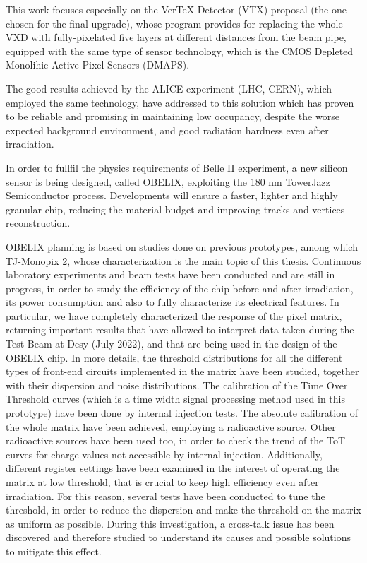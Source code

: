 This work focuses especially on the VerTeX Detector (VTX) proposal (the one chosen for the final upgrade), whose program provides for replacing the whole VXD with fully-pixelated five layers at different distances from the beam pipe, equipped with the same type of sensor technology, which is the CMOS Depleted Monolihic Active Pixel Sensors (DMAPS). 

The good results achieved by the ALICE experiment (LHC, CERN), which employed the same technology, have addressed to this solution which has proven to be reliable and promising in maintaining low occupancy, despite the worse expected background environment, and good radiation hardness even after irradiation. 

In order to fullfil the physics requirements of Belle II experiment, a new silicon sensor is being designed, called OBELIX, exploiting the 180 nm TowerJazz Semiconductor process. Developments will ensure a faster, lighter and highly granular chip, reducing the material budget and improving tracks and vertices reconstruction. 

OBELIX planning is based on studies done on previous prototypes, among which TJ-Monopix 2, whose characterization is the main topic of this thesis. Continuous laboratory experiments and beam tests have been conducted and are still in progress, in order to study the efficiency of the chip before and after irradiation, its power consumption and also to fully characterize its electrical features. 
In particular, we have completely characterized the response of the pixel matrix, returning important results that have allowed to interpret data taken during the Test Beam at Desy (July 2022), and that are being used in the design of the OBELIX chip. 
In more details, the threshold distributions for all the different types of front-end circuits implemented in the matrix have been studied, together with their dispersion and noise distributions. 
The calibration of the Time Over Threshold curves (which is a time width signal processing method used in this prototype) have been done by internal injection tests. The absolute calibration of the whole matrix have been achieved, employing a  radioactive source. Other radioactive sources have been used too, in order to check the trend of the ToT curves for charge values not accessible by internal injection. 
Additionally, different register settings have been examined in the interest of operating the matrix at low threshold, that is crucial to keep high efficiency even after irradiation. For this reason, several tests have been conducted to tune the threshold, in order to reduce the dispersion and make the threshold on the matrix as uniform as possible.
During this investigation, a cross-talk issue has been discovered and therefore studied to understand its causes and possible solutions to mitigate this effect.







